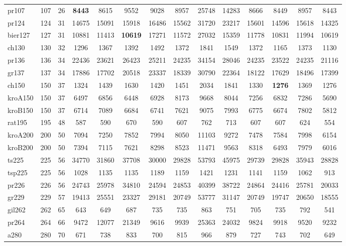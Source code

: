 \begin{table}[htbp]
{{\begin{tabular}{|l|c|c|c|c|c|c|c|c|c|c|c|c|c|}
pr107 & 107 & 26 & \textbf{8443} & 8615 & 9552 & 9028 & 8957 & 25748 & 14283 & 8666 & 8449 & 8957 & 8443 \\
pr124 & 124 & 31 & 14675 & 15091 & 15918 & 16486 & 15562 & 31720 & 23217 & 15601 & 14596 & 15618 & 14325 \\
bier127 & 127 & 31 & 10881 & 11413 & \textbf{10619} & 17271 & 11572 & 27032 & 15359 & 11778 & 10831 & 11994 & 10619 \\
ch130 & 130 & 32 & 1296 & 1367 & 1392 & 1492 & 1372 & 1841 & 1549 & 1372 & 1165 & 1373 & 1130 \\
pr136 & 136 & 34 & 22436 & 23621 & 26423 & 25211 & 24235 & 34154 & 28046 & 24235 & 23522 & 24235 & 21116 \\
gr137 & 137 & 34 & 17886 & 17702 & 20518 & 23337 & 18339 & 30790 & 22364 & 18122 & 17629 & 18496 & 17399 \\
ch150 & 150 & 37 & 1324 & 1439 & 1630 & 1420 & 1451 & 2034 & 1841 & 1330 & \textbf{1276} & 1369 & 1276 \\
kroA150 & 150 & 37 & 6497 & 6856 & 6448 & 6928 & 8173 & 9668 & 8044 & 7256 & 6832 & 7286 & 5690 \\
kroB150 & 150 & 37 & 6714 & 7089 & 6684 & 6741 & 7621 & 9075 & 7993 & 6775 & 6674 & 7802 & 5812 \\
rat195 & 195 & 48 & 587 & 590 & 670 & 590 & 607 & 762 & 713 & 607 & 607 & 624 & 554 \\
kroA200 & 200 & 50 & 7094 & 7250 & 7852 & 7994 & 8050 & 11103 & 9272 & 7478 & 7584 & 7998 & 6154 \\
kroB200 & 200 & 50 & 7394 & 7115 & 7621 & 8298 & 8523 & 11471 & 9563 & 8318 & 6493 & 7979 & 6016 \\
ts225 & 225 & 56 & 34770 & 31860 & 37708 & 30000 & 29828 & 53793 & 45975 & 29739 & 29828 & 35943 & 28828 \\
tsp225 & 225 & 56 & 1028 & 1135 & 1135 & 1189 & 1159 & 1421 & 1231 & 1141 & 1159 & 1062 & 913 \\
pr226 & 226 & 56 & 24743 & 25978 & 34810 & 24594 & 24853 & 40399 & 38722 & 24864 & 24416 & 25781 & 20033 \\
gr229 & 229 & 57 & 19413 & 25551 & 23327 & 29181 & 20749 & 53777 & 31147 & 20749 & 19747 & 20650 & 18555 \\
gil262 & 262 & 65 & 643 & 649 & 687 & 735 & 735 & 863 & 751 & 705 & 735 & 792 & 541 \\
pr264 & 264 & 66 & 9472 & 12077 & 21349 & 9616 & 9939 & 25363 & 24032 & 9824 & 9918 & 9520 & 9232 \\
a280 & 280 & 70 & 671 & 738 & 833 & 700 & 815 & 966 & 879 & 727 & 743 & 702 & 649 \\

\end{tabular}}}
\end{table}
